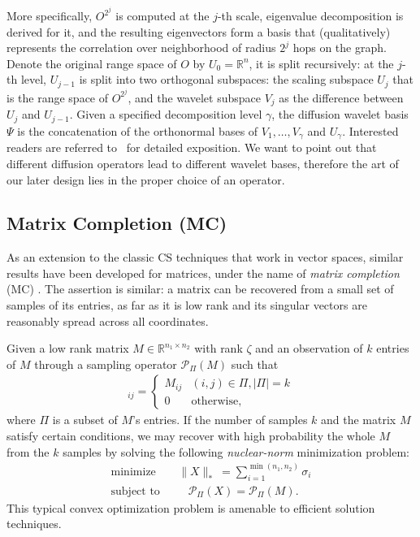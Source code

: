 \documentclass[conference]{IEEEtran}
\begin{document}
    More specifically, $O^{2^j}$ is computed at the $j$-th scale, eigenvalue decomposition is derived for it, and the resulting eigenvectors form a basis that (qualitatively) represents the correlation over neighborhood of radius $2^j$ hops on the graph. Denote the original range space of $O$ by $U_0 = \mathbb{R}^n$, it is split recursively: at the $j$-th level, $U_{j-1}$ is split into two orthogonal subspaces: the scaling subspace $U_{j}$ that is the range space of $O^{2^j}$, and the wavelet subspace $V_{j}$ as the difference between $U_j$ and $U_{j-1}$. Given a specified decomposition level $\gamma$, the diffusion wavelet basis $\Psi$ is the concatenation of the orthonormal bases of $V_{1}, \dots, V_{\gamma}$ and $U_{\gamma}$. Interested readers are referred to~\cite{CoifmanM-04} for detailed exposition. We want to point out that different diffusion operators lead to different wavelet bases, therefore the art of our later design lies in the proper choice of an operator.

  \subsection{Matrix Completion (MC)} \label{sec:mc}
As an extension to the classic CS techniques that work in vector spaces, similar results have been developed for matrices, under the name of \textit{matrix completion} (MC) \cite{CandesP-ProcIEEE10}. The assertion is similar: a matrix can be recovered from a small set of samples of its entries, as far as it is low rank and its singular vectors are reasonably spread across all coordinates.

    Given a low rank matrix $M \in \mathbb{R}^{n_1 \times n_2}$ with rank $\zeta$ and an observation of $k$ entries of $M$ through a sampling operator $\mathcal{P}_{\Pi}(M)$ such that
    \begin{eqnarray}
    [\mathcal{P}_{\Pi}(M)]_{ij} =
      \begin{cases}
      M_{ij} & (i,j) \in \Pi, |\Pi| = k \\
      0 & \mathrm{otherwise},
      \end{cases}
    \nonumber
    \end{eqnarray}
where $\Pi$ is a subset of $M$'s entries. If the number of samples $k$ and the matrix $M$ satisfy certain conditions, we may recover with high probability the whole $M$ from the $k$ samples by solving the following \textit{nuclear-norm} minimization problem:
    \begin{eqnarray}
\mathrm{minimize} && \|X\|_\ast ~= \!\!\sum_{i=1}^{\min(n_1,n_2)} \sigma_i \label{eq:mc} \\
\mbox{subject to} && ~~~~\mathcal{P}_{\Pi}(X) = \mathcal{P}_{\Pi}(M). \nonumber
\end{eqnarray}
This typical convex optimization problem is amenable to efficient solution techniques.
\end{document}
